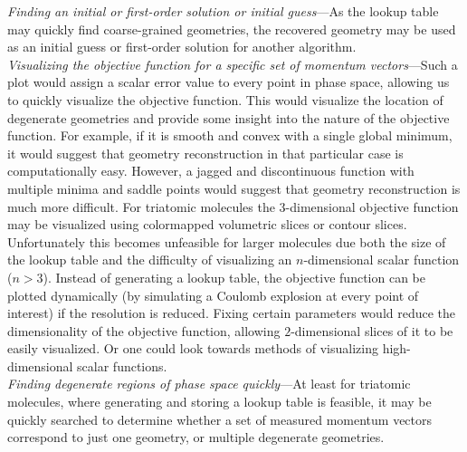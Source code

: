 \emph{Finding an initial or first-order solution or initial guess}---As the lookup table may quickly find coarse-grained geometries, the recovered geometry may be used as an initial guess or first-order solution for another algorithm. \\

\noindent
\emph{Visualizing the objective function for a specific set of momentum vectors}---Such a plot would assign a scalar error value to every point in phase space, allowing us to quickly visualize the objective function. This would visualize the location of degenerate geometries and provide some insight into the nature of the objective function. For example, if it is smooth and convex with a single global minimum, it would suggest that geometry reconstruction in that particular case is computationally easy. However, a jagged and discontinuous function with multiple minima and saddle points would suggest that geometry reconstruction is much more difficult. For triatomic molecules the $3$-dimensional objective function may be visualized using colormapped volumetric slices or contour slices. Unfortunately this becomes unfeasible for larger molecules due both the size of the lookup table and the difficulty of visualizing an $n$-dimensional scalar function ($n>3$). Instead of generating a lookup table, the objective function can be plotted dynamically (by simulating a Coulomb explosion at every point of interest) if the resolution is reduced. Fixing certain parameters would reduce the dimensionality of the objective function, allowing $2$-dimensional slices of it to be easily visualized. Or one could look towards methods of visualizing high-dimensional scalar functions. \\

\noindent
\emph{Finding degenerate regions of phase space quickly}---At least for triatomic molecules, where generating and storing a lookup table is feasible, it may be quickly searched to determine whether a set of measured momentum vectors correspond to just one geometry, or multiple degenerate geometries. 

